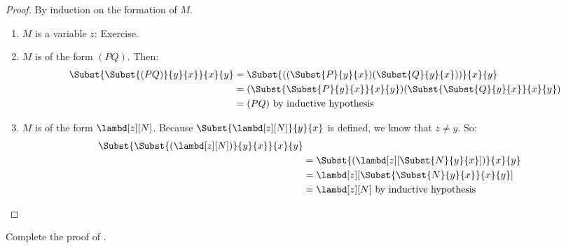 \documentclass[../../../include/open-logic-section]{subfiles}
\begin{document}
\begin{proof}
  By induction on the formation of $M$.
  \begin{enumerate}
  \item $M$ is a variable $z$: Exercise.
  \item $M$ is of the form $(PQ)$. Then:
    \begin{align*}
      \Subst{\Subst{(PQ)}{y}{x}}{x}{y}
      &=\Subst{((\Subst{P}{y}{x})(\Subst{Q}{y}{x}))}{x}{y} \\
      &= (\Subst{\Subst{P}{y}{x}}{x}{y})(\Subst{\Subst{Q}{y}{x}}{x}{y}) \\
      &= (PQ) \text{ by inductive hypothesis}
    \end{align*}
  \item $M$ is of the form $\lambd[z][N]$. Because
    $\Subst{\lambd[z][N]}{y}{x}$ is defined, we know
    that $z \neq y$. So:
    \begin{align*}
      \Subst{\Subst{(\lambd[z][N])}{y}{x}}{x}{y}\\
      & = \Subst{(\lambd[z][\Subst{N}{y}{x}])}{x}{y} \\
      & = \lambd[z][\Subst{\Subst{N}{y}{x}}{x}{y}] \\
      &= \lambd[z][N] \text{ by inductive hypothesis} 
    \end{align*}
  \end{enumerate}
\end{proof}

\begin{prob}
  Complete the proof of .
\end{prob}
\end{document}
